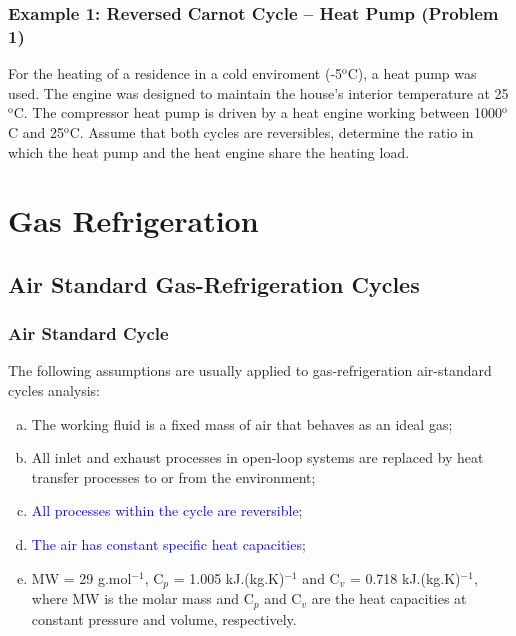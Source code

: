 \documentclass[10pt,compress]{beamer}
\newcommand{\blue}{\textcolor{blue}}
\begin{document}
\begin{frame}
 \frametitle{Example 1: Reversed Carnot Cycle -- Heat Pump (Problem 1)}
    For the heating of a residence in a cold enviroment (-5$^{\text{o}}$C), a heat pump was used. The engine was designed to maintain the house's interior temperature at 25$^{\text{o}}$C. The compressor heat pump is driven by a heat engine working between 1000$^{\text{o}}$C and 25$^{\text{o}}$C. Assume that both cycles are reversibles, determine the ratio in which the heat pump and the heat engine share the heating load.

 
\end{frame}


\section{Gas Refrigeration}



\subsection{Air Standard Gas-Refrigeration Cycles}

\begin{frame}
 \frametitle{Air Standard Cycle}
The following assumptions are usually applied to gas-refrigeration air-standard cycles analysis:
  \begin{enumerate}[(a)]
   \item <2-> The working fluid is a fixed mass of air that behaves as an ideal gas;
   \item <2-> All inlet and exhaust processes in open-loop systems are replaced by heat transfer processes to or from the environment;
   \item <3-> \blue{All processes within the cycle are reversible};
   \item <3-> \blue{The air has constant specific heat capacities};
   \item <3-> MW = 29 g.mol$^{-1}$, C$_{p}$ = 1.005 kJ.(kg.K)$^{-1}$ and C$_{v}$ = 0.718 kJ.(kg.K)$^{-1}$, where MW is the molar mass and C$_{p}$ and C$_{v}$ are the heat capacities at constant pressure and volume, respectively.
  \end{enumerate}
\end{frame}


\end{document}
